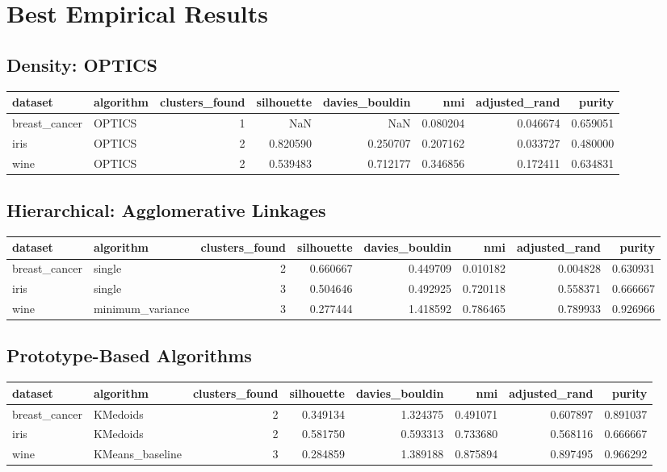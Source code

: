 \documentclass[11pt]{article}
\begin{document}
\section*{Best Empirical Results}
\subsection*{Density: OPTICS}
\begin{tabular}{llrrrrrr}
\toprule
       dataset & algorithm &  clusters\_found &  silhouette &  davies\_bouldin &       nmi &  adjusted\_rand &    purity \\
\midrule
 breast\_cancer &    OPTICS &               1 &         NaN &             NaN &  0.080204 &       0.046674 &  0.659051 \\
          iris &    OPTICS &               2 &    0.820590 &        0.250707 &  0.207162 &       0.033727 &  0.480000 \\
          wine &    OPTICS &               2 &    0.539483 &        0.712177 &  0.346856 &       0.172411 &  0.634831 \\
\bottomrule
\end{tabular}

\subsection*{Hierarchical: Agglomerative Linkages}
\begin{tabular}{llrrrrrr}
\toprule
       dataset &         algorithm &  clusters\_found &  silhouette &  davies\_bouldin &       nmi &  adjusted\_rand &    purity \\
\midrule
 breast\_cancer &            single &               2 &    0.660667 &        0.449709 &  0.010182 &       0.004828 &  0.630931 \\
          iris &            single &               3 &    0.504646 &        0.492925 &  0.720118 &       0.558371 &  0.666667 \\
          wine &  minimum\_variance &               3 &    0.277444 &        1.418592 &  0.786465 &       0.789933 &  0.926966 \\
\bottomrule
\end{tabular}

\subsection*{Prototype-Based Algorithms}
\begin{tabular}{llrrrrrr}
\toprule
       dataset &        algorithm &  clusters\_found &  silhouette &  davies\_bouldin &       nmi &  adjusted\_rand &    purity \\
\midrule
 breast\_cancer &         KMedoids &               2 &    0.349134 &        1.324375 &  0.491071 &       0.607897 &  0.891037 \\
          iris &         KMedoids &               2 &    0.581750 &        0.593313 &  0.733680 &       0.568116 &  0.666667 \\
          wine &  KMeans\_baseline &               3 &    0.284859 &        1.389188 &  0.875894 &       0.897495 &  0.966292 \\
\bottomrule
\end{tabular}
\end{document}
